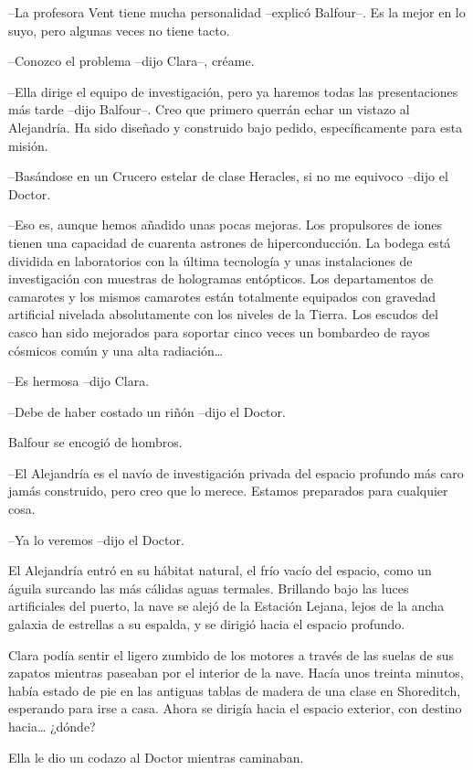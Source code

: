 {--La profesora Vent tiene mucha personalidad --explicó Balfour--. Es la
mejor en lo suyo, pero algunas veces no tiene tacto.}

{--Conozco el problema --dijo Clara--, créame.}

{--Ella dirige el equipo de investigación, pero ya haremos todas las
 presentaciones más tarde --dijo Balfour--. Creo que primero querrán
 echar un vistazo al Alejandría. Ha sido diseñado y construido bajo
pedido, específicamente para esta misión.}

{--Basándose en un Crucero estelar de clase Heracles, si no me equivoco
--dijo el Doctor.}

{--Eso es, aunque hemos añadido unas pocas mejoras. Los propulsores de
 iones tienen una capacidad de cuarenta astrones de hiperconducción. La
 bodega está dividida en laboratorios con la última tecnología y unas
 instalaciones de investigación con muestras de hologramas entópticos.
 Los departamentos de camarotes y los mismos camarotes están totalmente
 equipados con gravedad artificial nivelada absolutamente con los niveles
 de la Tierra. Los escudos del casco han sido mejorados para soportar
 cinco veces un bombardeo de rayos cósmicos común y una alta
 radiación\ldots{}}

{--Es hermosa --dijo Clara.}

{--Debe de haber costado un riñón --dijo el Doctor.}

{Balfour se encogió de hombros.}

{--El Alejandría es el navío de investigación privada del espacio
 profundo más caro jamás construido, pero creo que lo merece. Estamos
preparados para cualquier cosa.}

{--Ya lo veremos --dijo el Doctor.}

{El Alejandría entró
 en su hábitat natural, el frío vacío del espacio, como un águila
 surcando las más cálidas aguas termales. Brillando bajo las luces
 artificiales del puerto, la nave se alejó de la Estación Lejana, lejos
 de la ancha galaxia de estrellas a su espalda, y se dirigió hacia el
espacio profundo.}

{Clara podía sentir el ligero zumbido de los motores a través de las
 suelas de sus zapatos mientras paseaban por el interior de la nave.
 Hacía unos treinta minutos, había estado de pie en las antiguas tablas
 de madera de una clase en Shoreditch, esperando para irse a casa. Ahora
 se dirigía hacia el espacio exterior, con destino hacia\ldots{}
¿dónde?}

{Ella le dio un codazo al Doctor mientras caminaban.}

